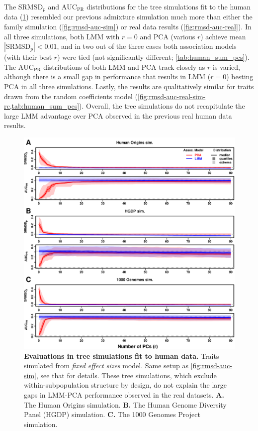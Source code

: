 \documentclass[11pt]{article}
\newcommand{\rmsd}{\text{SRMSD}_p}
\newcommand{\auc}{\text{AUC}_\text{PR}}
\begin{document}
The $\rmsd$ and $\auc$ distributions for the tree simulations fit to the human data (\cref{fig:rmsd-auc-real-sim}) resembled our previous admixture simulation much more than either the family simulation (\cref{fig:rmsd-auc-sim}) or real data results (\cref{fig:rmsd-auc-real}).
In all three simulations, both LMM with $r=0$ and PCA (various $r$) achieve mean $|\rmsd| < 0.01$, and in two out of the three cases both association models (with their best $r$) were tied (not significantly different; \cref{tab:human_sum_pcs}).
The $\auc$ distributions of both LMM and PCA track closely as $r$ is varied, although there is a small gap in performance that results in LMM ($r=0$) besting PCA in all three simulations.
Lastly, the results are qualitatively similar for traits drawn from the random coefficients model (\cref{fig:rmsd-auc-real-sim-rc,tab:human_sum_pcs}).
Overall, the tree simulations do not recapitulate the large LMM advantage over PCA observed in the previous real human data results.

\begin{figure}[bp!]
  \centering
  \includegraphics[width=\textwidth,height=\textheight,keepaspectratio]{fes/rmsd-auc-real-sim.pdf}
  \caption{
    {\small 
      {\bf Evaluations in tree simulations fit to human data.}
      Traits simulated from \textit{fixed effect sizes} model.
      Same setup as \cref{fig:rmsd-auc-sim}, see that for details.
      These tree simulations, which exclude within-subpopulation structure by design, do not explain the large gaps in LMM-PCA performance observed in the real datasets.
      \textbf{A.}
      The Human Origins simulation.
      \textbf{B.}
      The Human Genome Diversity Panel (HGDP) simulation.
      \textbf{C.}
      The 1000 Genomes Project simulation.
    }
  }
  \label{fig:rmsd-auc-real-sim}
\end{figure}
\end{document}
